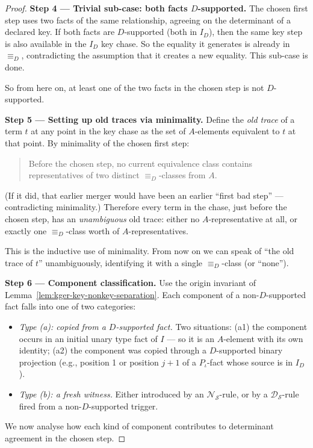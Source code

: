 \documentclass[10pt]{article}
\begin{document}
\begin{proof}
\smallskip\noindent\textbf{Step 4 --- Trivial sub-case: both facts
\(D\)-supported.}
The chosen first step uses two facts of the same relationship, agreeing
on the determinant of a declared key.  If both facts are
\(D\)-supported (both in \(I_D\)), then the same key step is also
available in the \(I_D\) key chase.  So the equality it generates is
already in \(\equiv_D\), contradicting the assumption that it creates a
new equality.  This sub-case is done.

So from here on, at least one of the two facts in the chosen step is
not \(D\)-supported.

\smallskip\noindent\textbf{Step 5 --- Setting up old traces via
minimality.}
Define the \emph{old trace} of a term \(t\) at any point in the key
chase as the set of \(A\)-elements equivalent to \(t\) at that point.
By minimality of the chosen first step:
\begin{quote}
Before the chosen step, no current equivalence class contains
representatives of two distinct \(\equiv_D\)-classes from \(A\).
\end{quote}
(If it did, that earlier merger would have been an earlier ``first
bad step'' --- contradicting minimality.)  Therefore every term in the
chase, just before the chosen step, has an \emph{unambiguous} old
trace: either no \(A\)-representative at all, or exactly one
\(\equiv_D\)-class worth of \(A\)-representatives.

This is the inductive use of minimality.  From now on we can speak of
``the old trace of \(t\)'' unambiguously, identifying it with a single
\(\equiv_D\)-class (or ``none'').

\smallskip\noindent\textbf{Step 6 --- Component classification.}
Use the origin invariant of
Lemma~\ref{lem:kger-key-nonkey-separation}.  Each component of a
non-\(D\)-supported fact falls into one of two categories:
\begin{itemize}
\item \emph{Type (a): copied from a \(D\)-supported fact.}  Two
situations: (a1) the component occurs in an initial unary type fact of
\(I\) --- so it is an \(A\)-element with its own identity; (a2) the
component was copied through a \(D\)-supported binary projection (e.g.,
position 1 or position \(j+1\) of a \(P_\iota\)-fact whose source is
in \(I_D\)).
\item \emph{Type (b): a fresh witness.}  Either introduced by an
\(\mathcal N_{\mathcal S}\)-rule, or by a \(\mathcal D_{\mathcal S}\)-rule
fired from a non-\(D\)-supported trigger.
\end{itemize}
We now analyse how each kind of component contributes to determinant
agreement in the chosen step.


\end{proof}
\end{document}
